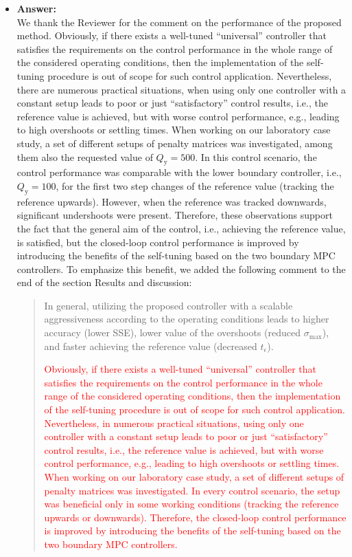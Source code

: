 \documentclass[a4paper,10pt]{article}
\newcommand{\change}[1]{\textcolor{red}{#1}}
\newcommand{\answer}[1]{
	\begin{itemize}
		\item[] \textbf{Answer:}\\ #1
	\end{itemize}
}
\begin{document}
	\answer{		
		We thank the Reviewer for the comment on the performance of the proposed method. Obviously, if there exists a well-tuned ``universal'' controller that satisfies the requirements on the control performance in the whole range of the considered operating conditions, then the implementation of the self-tuning procedure is out of scope for such control application. Nevertheless, there are numerous practical situations, when using only one controller with a constant setup leads to poor or just ``satisfactory'' control results, i.e., the reference value is achieved, but with worse control performance, e.g., leading to high overshoots or settling times. When working on our laboratory case study, a set of different setups of penalty matrices was investigated, among them also the requested value of $Q_\mathrm{y} = 500$. In this control scenario, the control performance was comparable with the lower boundary controller, i.e., $Q_\mathrm{y} = 100$, for the first two step changes of the reference value (tracking the reference upwards). However, when the reference was tracked downwards, significant undershoots were present. Therefore, these observations support the fact that the general aim of the control, i.e., achieving the reference value, is satisfied, but the closed-loop control performance is improved by introducing the benefits of the self-tuning based on the two boundary MPC controllers. To emphasize this benefit, we added the following comment to the end of the section Results and discussion: 
		\begin{quote}			
			In general, utilizing the proposed controller with a scalable aggressiveness according to the operating conditions leads to higher accuracy (lower SSE), lower value of the overshoots (reduced $\sigma_{\mathrm{max}}$), and faster achieving the reference value (decreased $t_{\epsilon}$).
			
			\change{Obviously, if there exists a well-tuned ``universal'' controller that satisfies the requirements on the control performance in the whole range of the considered operating conditions, then the implementation of the self-tuning procedure is out of scope for such control application. Nevertheless, in numerous practical situations, using only one controller with a constant setup leads to poor or just ``satisfactory'' control results, i.e., the reference value is achieved, but with worse control performance, e.g., leading to high overshoots or settling times. When working on our laboratory case study, a set of different setups of penalty matrices was investigated. In every control scenario, the setup was beneficial only in some working conditions (tracking the reference upwards or downwards). Therefore, the closed-loop control performance is improved by introducing the benefits of the self-tuning based on the two boundary MPC controllers.}
		\end{quote}		
	}
\end{document}
